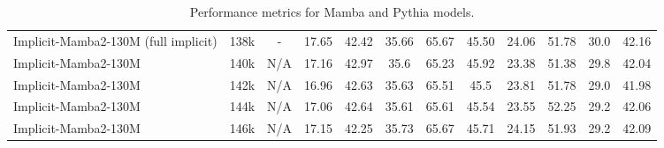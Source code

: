 \begin{table}[h]
{\begin{tabular}{lccccccccccc}
            Implicit-Mamba2-130M (full implicit) & 138k & - & 17.65 & 42.42 & 35.66 & 65.67 & 45.50 & 24.06 & 51.78 & 30.0 & 42.16\\
            
            Implicit-Mamba2-130M & 140k & N/A & 17.16 & 42.97 & 35.6 & 65.23 & 45.92 & 23.38 & 51.38 & 29.8 & 42.04\\

            Implicit-Mamba2-130M & 142k & N/A & 16.96 & 42.63 & 35.63 & 65.51 & 45.5 & 23.81 & 51.78 & 29.0 & 41.98\\

            Implicit-Mamba2-130M & 144k & N/A & 17.06 & 42.64 & 35.61 & 65.61 & 45.54 & 23.55 & 52.25 & 29.2 & 42.06\\

            Implicit-Mamba2-130M & 146k & N/A & 17.15 & 42.25 & 35.73 & 65.67 & 45.71 & 24.15 & 51.93 & 29.2 & 42.09\\



            

            
            

            
        \end{tabular}  
    }  
    \caption{Performance metrics for Mamba and Pythia models.}  
    \label{tab:model_performance}  
\end{table}